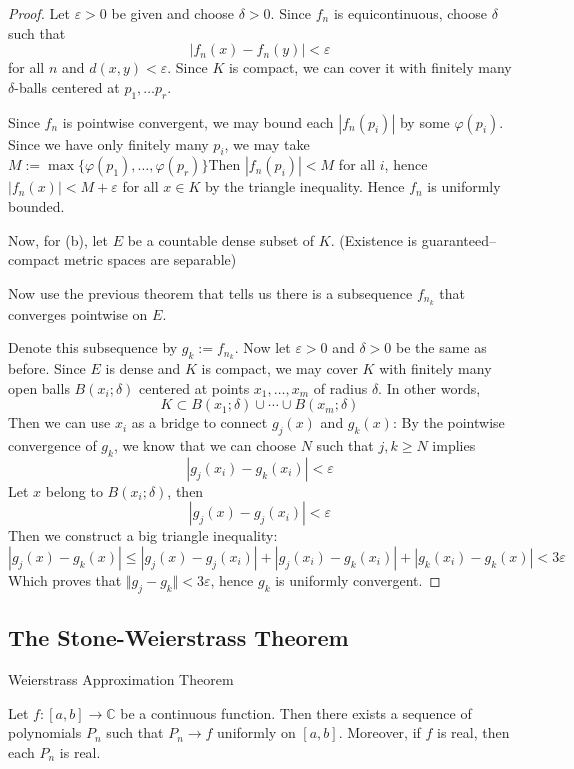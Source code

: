 \begin{proof}
    Let $\varepsilon >0$ be given and choose $\delta > 0$. Since $f_n$ is equicontinuous, choose $\delta$ such that
    \[|f_n(x) - f_n(y)| < \varepsilon\]
    for all $n$ and $d(x, y) < \varepsilon$. Since $K$ is compact, we can cover it with finitely many $\delta$-balls centered at $p_1, \ldots p_r$. 

    Since $f_n$ is pointwise convergent, we may bound each $|f_n(p_i)|$ by some $\varphi(p_i)$. Since we have only finitely many $p_i$, we may take $M := \max \{\varphi(p_1), \ldots, \varphi(p_r)\}$Then $|f_n(p_i)| < M$ for all $i$, hence $|f_n(x)| < M + \varepsilon$ for all $x \in K$ by the triangle inequality. Hence $f_n$ is uniformly bounded.

    Now, for (b), let $E$ be a countable dense subset of $K$. (Existence is guaranteed-- compact metric spaces are separable)

    Now use the previous theorem that tells us there is a subsequence $f_{n_k}$ that converges pointwise on $E$.

    Denote this subsequence by $g_k := f_{n_k}$. Now let $\varepsilon > 0$ and $\delta > 0$ be the same as before. Since $E$ is dense and $K$ is compact, we may cover $K$ with finitely many open balls $B(x_i; \delta)$ centered at points $x_1, \ldots, x_m$ of radius $\delta$. In other words,
    \[K \subset B(x_1; \delta) \cup \cdots \cup B(x_m; \delta)\]
    Then we can use $x_i$ as a bridge to connect $g_j(x)$ and $g_k(x)$: By the pointwise convergence of $g_k$, we know that we can choose $N$ such that $j, k \geq N$ implies 
    \[|g_j(x_i) - g_k(x_i)| < \varepsilon\]
    Let $x$ belong to $B(x_i; \delta)$, then
    \[|g_j(x) - g_j(x_i)| < \varepsilon\]
    Then we construct a big triangle inequality:
    \[|g_j(x) - g_k(x)| \leq |g_j(x) - g_j(x_i)| + |g_j(x_i) - g_k(x_i)| + |g_k(x_i) - g_k(x)| < 3\varepsilon\]
    Which proves that $\Vert g_j - g_k \Vert < 3\varepsilon$, hence $g_k$ is uniformly convergent.
\end{proof}

\subsection{The Stone-Weierstrass Theorem}

\begin{theorem} Weierstrass Approximation Theorem

    Let $f: [a, b] \to \mathbb{C}$ be a continuous function. Then there exists a sequence of polynomials $P_n$ such that $P_n \to f$ uniformly on $[a, b]$. Moreover, if $f$ is real, then each $P_n$ is real.
\end{theorem}

